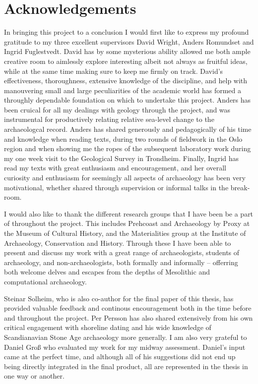 \pagestyle{plain}
\setcounter{page}{3}

\section*{Acknowledgements}
In bringing this project to a conclusion I would first like to express my profound gratitude to my three excellent supervisors David Wright, Anders Romundset and Ingrid Fuglestvedt. David has by some mysterious ability allowed me both ample creative room to aimlessly explore interesting albeit not always as fruitful ideas, while at the same time making sure to keep me firmly on track. David's effectiveness, thoroughness, extensive knowledge of the discipline, and help with manouvering small and large peculiarities of the academic world has formed a throughly dependable foundation on which to undertake this project. Anders has been cruical for all my dealings with geology through the project, and was instrumental for productively relating relative sea-level change to the archaeologcal record. Anders has shared generously and pedagogically of his time and knowledge when reading texts, during two rounds of fieldwork in the Oslo region and when showing me the ropes of the subsequent laboratory work during my one week visit to the Geological Survey in Trondheim. Finally, Ingrid has read my texts with great enthusiasm and encouragement, and her overall curiosity and enthusiasm for seemingly all aspects of archaeology has been very motivational, whether shared through supervision or informal talks in the break-room.  

I would also like to thank the different research groups that I have been be a part of throughout the project. This includes Prehcoast and Archaeology by Proxy at the Museum of Cultural History, and the Materialities group at the Institute of Archaeology, Conservation and History. Through these I have been able to present and discuss my work with a great range of archaeologists, students of archaeology, and non-archaeologists, both formally and informally -- offerring both welcome delves and escapes from the depths of Mesolithic and computational archaeology.

Steinar Solheim, who is also co-author for the final paper of this thesis, has provided valuable feedback and continous encouragement both in the time before and throughout the project. Per Persson has also shared extensively from his own critical engagement with shoreline dating and his wide knowledge of Scandianavian Stone Age archaeology more generally. I am also very grateful to Daniel Groß who evaluated my work for my midway assessment. Daniel's input came at the perfect time, and although all of his suggestions did not end up being directly integrated in the final product, all are represented in the thesis in one way or another.


